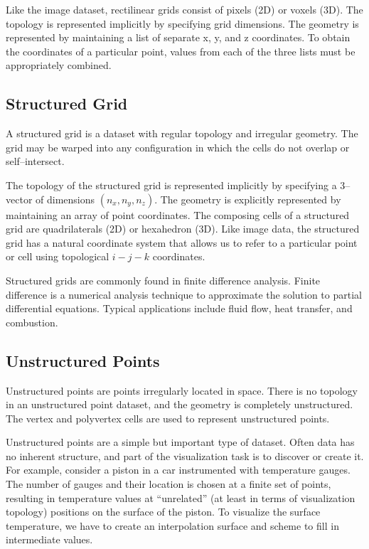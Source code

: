 Like the image dataset, rectilinear grids consist of pixels (2D) or voxels (3D). The topology is represented implicitly by specifying grid dimensions. The geometry is represented by maintaining a list of separate x, y, and z coordinates. To obtain the coordinates of a particular point, values from each of the three lists must be appropriately combined.

\subsection{Structured Grid}

A structured grid is a dataset with regular topology and irregular geometry. The grid may be warped into any configuration in which the cells do not overlap or self--intersect.

The topology of the structured grid is represented implicitly by specifying a 3--vector of dimensions $(n_x, n_y, n_z)$. The geometry is explicitly represented by maintaining an array of point coordinates. The composing cells of a structured grid are quadrilaterals (2D) or hexahedron (3D). Like image data, the structured grid has a natural coordinate system that allows us to refer to a particular point or cell using topological $i-j-k$ coordinates.

Structured grids are commonly found in finite difference analysis. Finite difference is a numerical analysis technique to approximate the solution to partial differential equations. Typical applications include fluid flow, heat transfer, and combustion.

\subsection{Unstructured Points}

Unstructured points are points irregularly located in space. There is no topology in an unstructured point dataset, and the geometry is completely unstructured. The vertex and polyvertex cells are used to represent unstructured points.

Unstructured points are a simple but important type of dataset. Often data has no inherent structure, and part of the visualization task is to discover or create it. For example, consider a piston in a car instrumented with temperature gauges. The number of gauges and their location is chosen at a finite set of points, resulting in temperature values at ``unrelated'' (at least in terms of visualization topology) positions on the surface of the piston. To visualize the surface temperature, we have to create an interpolation surface and scheme to fill in intermediate values.

